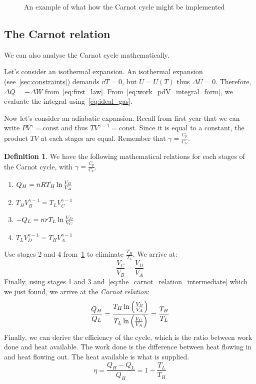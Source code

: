 \documentclass[12pt,chapterprefix=false,dvipsnames]{scrbook}
\theoremstyle{dotless}
\theoremstyle{definition}
\newtheorem{protodefinition}{Definition}[section]
\newenvironment{definition}
{\colorlet{shadecolor}{black!15}\begin{shaded}\begin{protodefinition}}
			{\end{protodefinition}\end{shaded}}
\begin{document}
\begin{figure}[htpb]
	\centering
	
	\caption{An example of what how the Carnot cycle might be implemented}%
	\label{fig:carnot_cycle_example}
\end{figure}

\subsection{The Carnot relation}%
\label{sub:the_carnot_relation}

We can also analyse the Carnot cycle mathematically.

Let's consider an isothermal expansion. An isothermal expansion
(see~\ref{sec:constraints}) demands $\dd{T} = 0$,
but $U = U(T)$ thus $\Delta U = 0$.
Therefore, $\Delta Q = -\Delta W$
from~\ref{eq:first_law}. From~\ref{eq:work_pdV_integral_form}, we
evaluate the integral using~\ref{eq:ideal_gas}.

Now let's consider an adiabatic expansion. Recall from first
year that we can write $PV^\gamma = \mathrm{const}$ and thus
$TV^{\gamma - 1} = \mathrm{const}$. Since it is equal to a constant, the
product $TV$ at each stages are equal.
Remember that $\gamma = \frac{C_p}{C_V}$.

\begin{definition}%
	\label{eq:carnot_stages}
	We have the following mathematical relations for each stages of
	the Carnot cycle, with $\gamma = \frac{C_p}{C_V}$.
	\begin{enumerate}
		\item $Q_H = nRT_H\naturallogarithm\frac{V_B}{V_A}$
		\item $T_H V_B^{\gamma - 1} = T_L V_C^{\gamma - 1}$
		\item $-Q_L = nrT_L\naturallogarithm\frac{V_D}{V_C}$
		\item $T_L V_D^{\gamma - 1} = T_H V_A^{\gamma - 1}$
	\end{enumerate}
	Use stages 2 and 4 from~\ref{eq:carnot_stages} to eliminate
	$\frac{T_H}{T_L}$. We arrive at:
	\begin{equation}
		\label{eq:the_carnot_relation_intermediate}
		\frac{V_C}{V_B}
		=
		\frac{V_D}{V_A}
	\end{equation}
	Finally, using stages 1 and 3 and~\ref{eq:the_carnot_relation_intermediate} which
	we just found, we arrive at the \textit{Carnot relation}:
	\begin{equation}
		\frac{Q_H}{Q_L}
		=
		\frac{T_H\naturallogarithm\left(\frac{V_B}{V_A}\right)}{T_L\naturallogarithm\left(\frac{V_C}{V_A}\right)}
		=
		\frac{T_H}{T_L}
	\end{equation}
	Finally, we can derive the efficiency of the cycle, which is the
	ratio between work done and heat available. The work done is the
	difference between heat flowing in and heat flowing out. The
	heat available is what is supplied.
	\begin{equation}
		\label{eq:carnot_efficiency}
		\eta = \frac{Q_H - Q_L}{Q_H} = 1 - \frac{T_L}{T_H}
	\end{equation}
\end{definition}
\end{document}
